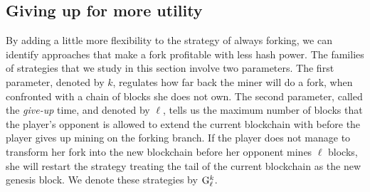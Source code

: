 %

\subsection{Giving up for more utility}
\label{sec-giving-up}


By adding a little more flexibility to the strategy of always forking, we can identify approaches that make a fork profitable with less hash power. The families of strategies that we study in this section involve two parameters. The first parameter, denoted by $k$, regulates how far back the miner will do a fork, when confronted with a chain of blocks she does not own. The second parameter, called the \textit{give-up} time, and denoted by $\ell$, tells us the maximum number of blocks that the player's opponent is allowed to extend the current blockchain with before the player gives up mining on the forking branch. If the player does not manage to transform her fork into the new blockchain before her opponent mines $\ell$ blocks, she will restart the strategy treating the tail of the current blockchain as the new genesis block. We denote these strategies by ${\rm {G}}_\ell^k$. 


